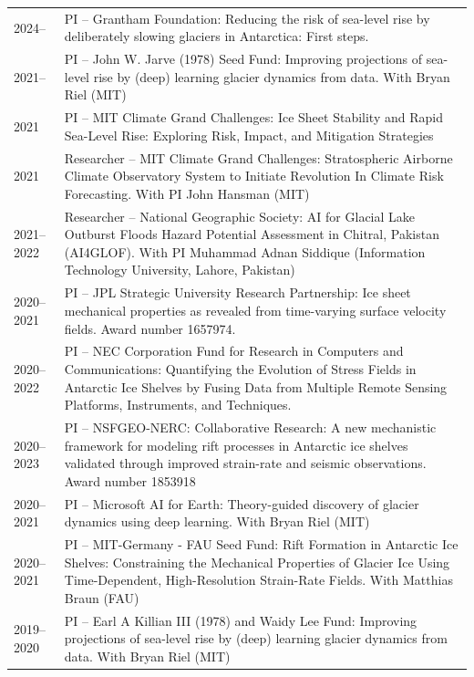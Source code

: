 \documentclass[11pt, oneside]{article}
\newcommand{\cvsection}[1]{%
  \vspace{4mm}%
  \noindent{\large\sffamily\bfseries\color{DeepTeal}#1}%
  \vspace{1mm}%
  \par\noindent{\color{CaltechOrange}\rule{\textwidth}{0.8pt}}%
  \vspace{2mm}%
}
\begin{document}
\cvsection{Grants}
\vspace{-2mm}
\begin{longtable}[h]{l p{14cm}}
2024-- 	& PI -- Grantham Foundation: Reducing the risk of sea-level rise by deliberately slowing glaciers in Antarctica: First steps. \\
2021--          & PI -- John W. Jarve (1978) Seed Fund: Improving projections of sea-level rise by (deep) learning glacier dynamics from data. With Bryan Riel (MIT) \\
2021         & PI -- MIT Climate Grand Challenges: Ice Sheet Stability and Rapid Sea-Level Rise: Exploring Risk, Impact, and Mitigation Strategies \\
2021         & Researcher -- MIT Climate Grand Challenges: Stratospheric Airborne Climate Observatory System to Initiate Revolution In Climate Risk Forecasting. With PI John Hansman (MIT) \\
2021--2022 & Researcher -- National Geographic Society: AI for Glacial Lake Outburst Floods Hazard Potential Assessment in Chitral, Pakistan (AI4GLOF). With PI Muhammad Adnan Siddique (Information Technology University, Lahore, Pakistan) \\
2020--2021 & PI -- JPL Strategic University Research Partnership: Ice sheet mechanical properties as revealed from time-varying surface velocity fields. Award number 1657974. \\
2020--2022 & PI -- NEC Corporation Fund for Research in Computers and Communications: Quantifying the Evolution of Stress Fields in Antarctic Ice Shelves by Fusing Data from Multiple Remote Sensing Platforms, Instruments, and Techniques. \\
2020--2023 & PI -- NSFGEO-NERC: Collaborative Research: A new mechanistic framework for modeling rift processes in Antarctic ice shelves validated through improved strain-rate and seismic observations. Award number 1853918 \\
2020--2021 & PI -- Microsoft AI for Earth: Theory-guided discovery of glacier dynamics using deep learning. With Bryan Riel (MIT) \\
2020--2021 & PI -- MIT-Germany - FAU Seed Fund: Rift Formation in Antarctic Ice Shelves: Constraining the Mechanical Properties of Glacier Ice Using Time-Dependent, High-Resolution Strain-Rate Fields. With Matthias Braun (FAU) \\
2019--2020 & PI -- Earl A Killian III (1978) and Waidy Lee Fund: Improving projections of sea-level rise by (deep) learning glacier dynamics from data. With Bryan Riel (MIT) \\

\end{longtable}
\end{document}
